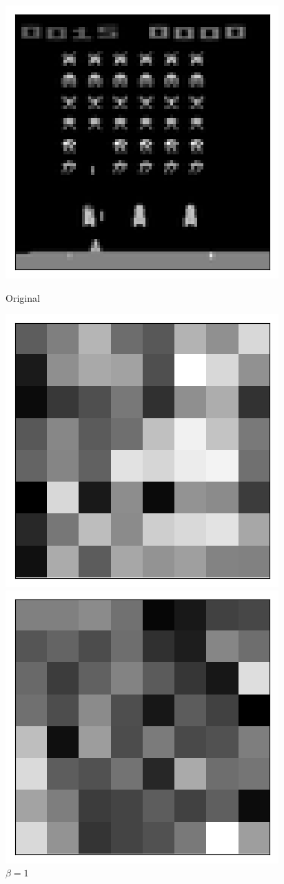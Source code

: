 \begin{figure}[h!]
\begin{multicols}{4}
    \includegraphics[scale=0.4]{figures/results/latent_image/beta_1_sample_30_original.png}
    \caption{Original}
    \includegraphics[scale=0.4]{figures/results/latent_image/beta_1_sample_30_latent.png}
    \caption{$\beta=1$}
    \includegraphics[scale=0.4]{figures/results/latent_image/beta_4_sample_30_latent.png}

\end{multicols}
\end{figure}
